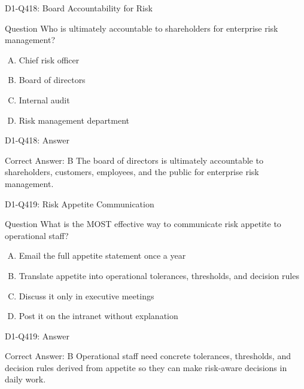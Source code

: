 \documentclass{beamer}
\begin{document}
\begin{frame}{D1-Q418: Board Accountability for Risk}
	\begin{block}{Question}
		Who is ultimately accountable to shareholders for enterprise risk management?
	\end{block}
	\begin{enumerate}[(A)]
		\item Chief risk officer
		\item Board of directors
		\item Internal audit
		\item Risk management department
	\end{enumerate}
\end{frame}
\begin{frame}{D1-Q418: Answer}
	\begin{block}{Correct Answer: B}
		The board of directors is ultimately accountable to shareholders, customers, employees, and the public for enterprise risk management.
	\end{block}
\end{frame}

\begin{frame}{D1-Q419: Risk Appetite Communication}
	\begin{block}{Question}
		What is the MOST effective way to communicate risk appetite to operational staff?
	\end{block}
	\begin{enumerate}[(A)]
		\item Email the full appetite statement once a year
		\item Translate appetite into operational tolerances, thresholds, and decision rules
		\item Discuss it only in executive meetings
		\item Post it on the intranet without explanation
	\end{enumerate}
\end{frame}
\begin{frame}{D1-Q419: Answer}
	\begin{block}{Correct Answer: B}
		Operational staff need concrete tolerances, thresholds, and decision rules derived from appetite so they can make risk-aware decisions in daily work.
	\end{block}
\end{frame}
\end{document}

